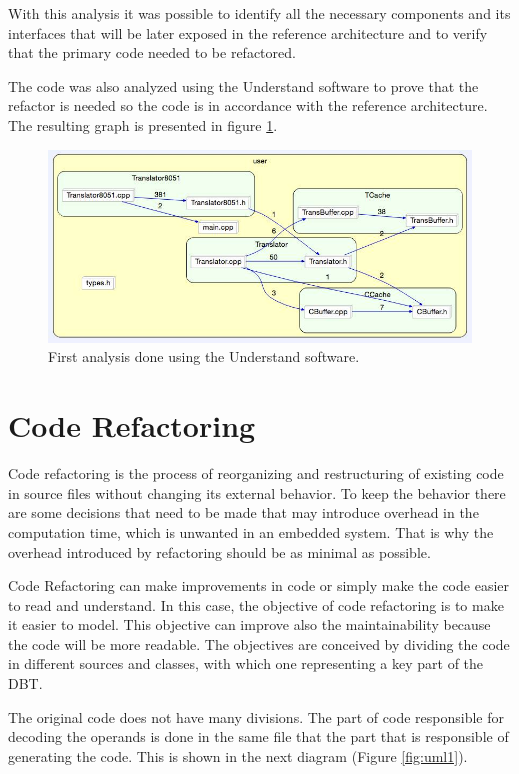 \documentclass[11pt]{report}
\begin{document}
	\par With this analysis it was possible to identify all the necessary components and its interfaces that will be later exposed in the reference architecture and to verify that the primary code needed to be refactored.

	\par The code was also analyzed using the Understand software to prove that the refactor is needed so the code is in accordance with the reference architecture. The resulting graph is presented in figure \ref{fig:understand1}.
	
	\begin{figure} [H]
		\centering
		\includegraphics[width=0.6\linewidth]{Images/refactor1.jpg}
		\caption{First analysis done using the Understand software.}
		\label{fig:understand1}
	\end{figure}

	\section{Code Refactoring}
	Code refactoring is the process of reorganizing and restructuring of existing code in source files without changing its external behavior. To keep the behavior there are some decisions that need to be made that may introduce overhead in the computation time, which is unwanted in an embedded system. That is why the overhead introduced by refactoring should be as minimal as possible.
	
	Code Refactoring can make improvements in code or simply make the code easier to read and understand.
	In this case, the objective of code refactoring is to make it easier to model. This objective can improve also the maintainability because the code will be more readable. The objectives are conceived by dividing the code in different sources and classes, with which one representing a key part of the DBT.
	
	The original code does not have many divisions. The part of code responsible for decoding the operands is done in the same file that the part that is responsible of generating the code. 
	This is shown in the next diagram (Figure \ref{fig:uml1}).
	
\end{document}
